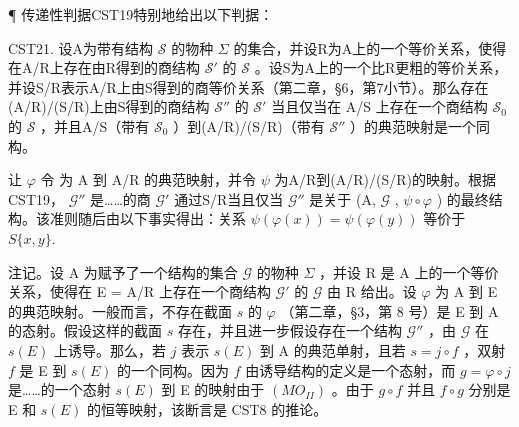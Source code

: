 ¶ 传递性判据CST19特别地给出以下判据：

CST21. 设A为带有结构 \(\mathcal{S}\) 的物种 \(\Sigma\) 的集合，并设R为A上的一个等价关系，使得在A/R上存在由R得到的商结构 \(\mathcal{S}'\) 的 \(\mathcal{S}\) 。设S为A上的一个比R更粗的等价关系，并设S/R表示A/R上由S得到的商等价关系（第二章，§6，第7小节）。那么存在(A/R)/(S/R)上由S得到的商结构 \(\mathcal{S}''\) 的 \(\mathcal{S}'\) 当且仅当在 A/S 上存在一个商结构 \(\mathcal{S}_0\) 的 \(\mathcal{S}\) ，并且A/S（带有 \(\mathcal{S}_0\) ）到(A/R)/(S/R)（带有 \(\mathcal{S}''\) ）的典范映射是一个同构。

让 \(\varphi\) 令 为 A 到 A/R 的典范映射，并令 \(\psi\) 为A/R到(A/R)/(S/R)的映射。根据CST19， \(\mathcal{G}''\) 是……的商 \(\mathcal{G}'\) 通过S/R当且仅当 \(\mathcal{G}''\) 是关于 (A, \(\mathcal{G}\) , \(\psi \circ \varphi\) ) 的最终结构。该准则随后由以下事实得出：关系 \(\psi(\varphi(x)) = \psi(\varphi(y))\) 等价于 \(S\{x,y\}\).

注记。设 A 为赋予了一个结构的集合 \(\mathcal{G}\) 的物种 \(\Sigma\) ，并设 R 是 A 上的一个等价关系，使得在 E = A/R 上存在一个商结构 \(\mathcal{G}'\) 的 \(\mathcal{G}\) 由 R 给出。设 \(\varphi\) 为 A 到 E 的典范映射。一般而言，不存在截面 \(s\) 的 \(\varphi\) （第二章，§3，第 8 号）是 E 到 A 的态射。假设这样的截面 \(s\) 存在，并且进一步假设存在一个结构 \(\mathcal{G}''\) ，由 \(\mathcal{G}\) 在 \(s(E)\) 上诱导。那么，若 \(j\) 表示 \(s(E)\) 到 A 的典范单射，且若 \(s = j \circ f\) ，双射 \(f\) 是 E 到 \(s(E)\) 的一个同构。因为 \(f\) 由诱导结构的定义是一个态射，而 \(g = \varphi \circ j\) 是……的一个态射 \(s(E)\) 到 E 的映射由于 \((MO_{II})\) 。由于 \(g \circ f\) 并且 \(f \circ g\) 分别是 E 和 \(s(E)\) 的恒等映射，该断言是 CST8 的推论。

